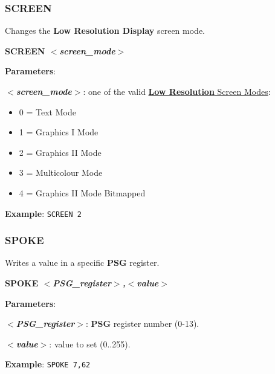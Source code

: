         \subsubsection{{SCREEN}}
        Changes the \textbf{Low Resolution Display} screen mode.

        \hspace{1.9cm}\textbf{SCREEN \textit{$<$screen\_mode$>$}}

        \textbf{Parameters}:

        \hspace{1cm}\textbf{\textit{$<$screen\_mode$>$}}: one of the valid
        \hyperref[sec:vdpscrmodes]{\textbf{Low Resolution} Screen Modes}:

        \begin{itemize}
            \item 0 = Text Mode
            \item 1 = Graphics I Mode
            \item 2 = Graphics II Mode
            \item 3 = Multicolour Mode
            \item 4 = Graphics II Mode Bitmapped
        \end{itemize}

        \textbf{Example}: \texttt{SCREEN 2}

        \subsubsection{{SPOKE}}
        Writes a value in a specific \textbf{PSG} register.

        \hspace{1.9cm}\textbf{SPOKE \textit{$<$PSG\_register$>$,$<$value$>$}}

        \textbf{Parameters}:

        \hspace{1cm}\textbf{\textit{$<$PSG\_register$>$}}: \textbf{PSG} register
        number (0-13).

        \hspace{1cm}\textbf{\textit{$<$value$>$}}: value to set (0..255).

        \textbf{Example}: \texttt{SPOKE 7,62}

